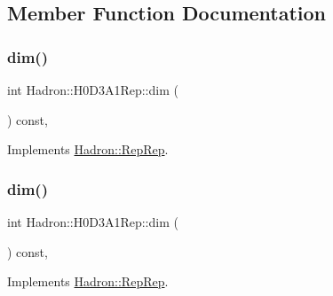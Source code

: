 \subsection{Member Function Documentation}
\mbox{\label{structHadron_1_1H0D3A1Rep_a783881d78557d5c845c79916a6367241}} 
\subsubsection{\texorpdfstring{dim()}{dim()}\hspace{0.1cm}{\footnotesize\ttfamily [1/5]}}
{\footnotesize\ttfamily int Hadron\+::\+H0\+D3\+A1\+Rep\+::dim (\begin{DoxyParamCaption}{ }\end{DoxyParamCaption}) const\hspace{0.3cm}{\ttfamily [inline]}, {\ttfamily [virtual]}}



Implements \mbox{\hyperlink{structHadron_1_1RepRep_a92c8802e5ed7afd7da43ccfd5b7cd92b}{Hadron\+::\+Rep\+Rep}}.

\mbox{\label{structHadron_1_1H0D3A1Rep_a783881d78557d5c845c79916a6367241}} 
\subsubsection{\texorpdfstring{dim()}{dim()}\hspace{0.1cm}{\footnotesize\ttfamily [2/5]}}
{\footnotesize\ttfamily int Hadron\+::\+H0\+D3\+A1\+Rep\+::dim (\begin{DoxyParamCaption}{ }\end{DoxyParamCaption}) const\hspace{0.3cm}{\ttfamily [inline]}, {\ttfamily [virtual]}}



Implements \mbox{\hyperlink{structHadron_1_1RepRep_a92c8802e5ed7afd7da43ccfd5b7cd92b}{Hadron\+::\+Rep\+Rep}}.

\mbox{\label{structHadron_1_1H0D3A1Rep_a783881d78557d5c845c79916a6367241}} 
